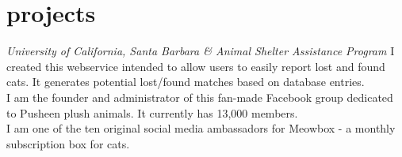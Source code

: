 \documentclass[
    changecolor={70,130,180}, 
]{cv-roald}
\newcommand{\paw}{\faPaw \hspace{.5mm}}
\begin{document}
\section*{\paw{} projects}
\newline \emph{University of California, Santa Barbara \& Animal Shelter Assistance Program}
\newline I created this webservice intended to allow users to easily report lost and found cats. It generates potential lost/found matches based on database entries.
\\
\newline I am the founder and administrator of this fan-made Facebook group dedicated to Pusheen plush animals. It currently has 13,000 members.
\\
\newline I am one of the ten original social media ambassadors for Meowbox - a monthly subscription box for cats.



%
    
\end{document}
